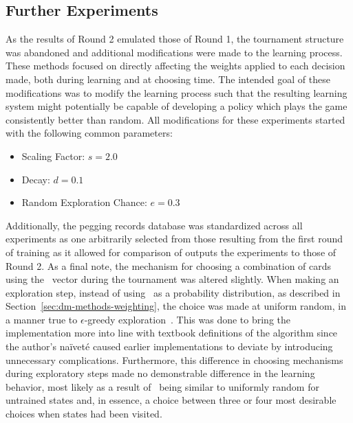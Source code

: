 

\subsection{Further Experiments}
\label{sec:findings-expts}

As the results of Round 2 emulated those of Round 1,
the tournament structure was abandoned and
additional modifications were made to the learning process.
%
These methods focused on directly affecting the weights applied to each
decision made,
both during learning and at choosing time.
%
The intended goal of these modifications was to modify the learning process
such that the resulting learning system might potentially be
capable of developing a policy which plays the game consistently better than
random.
%
All modifications for these experiments started with the following common
parameters:
\begin{itemize}
	\item Scaling Factor: $s = 2.0$
	\item Decay: $d = 0.1$
	\item Random Exploration Chance: $e = 0.3$
\end{itemize}
%
Additionally,
the pegging records database was standardized across all experiments
as one arbitrarily selected from those resulting from the first round of
training
as it allowed for comparison of outputs the experiments to those of Round 2.
%
As a final note,
the mechanism for choosing a combination of cards using the \pvec\ vector 
during the tournament was altered slightly.
%
When making an exploration step,
instead of using \pvec\ as a probability distribution,
as described in Section~\ref{sec:dm-methods-weighting},
the choice was made at uniform random,
in a manner true to $\epsilon$-greedy exploration~\cite{rl_book}.
%
This was done to bring the implementation more into line with
textbook definitions of the algorithm
since the author's naïveté caused earlier implementations to deviate
by introducing unnecessary complications.
%
Furthermore,
this difference in choosing mechanisms during exploratory steps
made no demonstrable difference in the learning behavior,
most likely as a result of \pvec\ being similar to uniformly random
for untrained states
and, in essence, a choice between three or four most desirable choices when
states had been visited.

%












